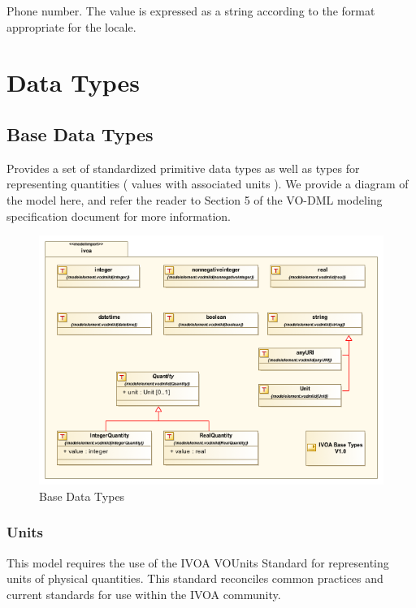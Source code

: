   Phone number. The value is expressed as a string according to the format
  appropriate for the locale.

  

\pagebreak
\section{Data Types}
\label{sect:types}

\subsection{Base Data Types}
\label{sect:ivoa}
Provides a set of standardized primitive data types as well as types for
representing quantities ( values with associated units ). We provide a diagram
of the model here, and refer the reader to Section 5 of the VO-DML modeling
specification document\citep{2018ivoa.spec.0910L} for more information.

  \begin{figure}[h]
  \begin{center}
    \includegraphics[width=4.875in]{diagrams/BaseTypes.png}
    \caption{Base Data Types}\label{fig:basetypes}
  \end{center}
  \end{figure}

  \subsubsection{Units}
  \label{sect:units}
  This model requires the use of the IVOA VOUnits Standard\citep{2014ivoa.spec.0523D} for representing
  units of physical quantities. This standard reconciles common practices and
  current standards for use within the IVOA community.
  
